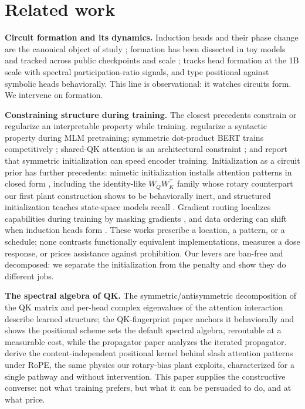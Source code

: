 \documentclass[11pt]{article}
\newcommand{\Rope}{RoPE\xspace}
\begin{document}
\section{Related work}
\textbf{Circuit formation and its dynamics.} Induction heads and their phase change are the canonical object of
study \citep{olsson2022induction}; formation has been dissected in toy models \citep{bietti2023birth,
reddy2024mechanistic,singh2024needs} and tracked across public checkpoints and scale
\citep{tigges2024llm}; \citet{xu2026when} tracks head formation at the 1B scale with spectral
participation-ratio signals, and \citet{urrutia2026positional} type positional against symbolic heads
behaviorally. This line is observational: it watches circuits form. We intervene on formation.

\textbf{Constraining structure during training.} The closest precedents constrain or regularize an interpretable
property while training. \citet{chen2024sudden} regularize a syntactic property during MLM pretraining;
symmetric dot-product BERT trains competitively \citep{courtois2024symmetric}; shared-QK attention is an
architectural constraint \citep{kitaev2020reformer}; and \citet{saponati2025} report that symmetric
initialization can speed encoder training. Initialization as a circuit prior has further precedents: mimetic
initialization installs attention patterns in closed form \citep{trockman2023mimetic}, including the
identity-like $W_QW_K^\top$ family whose rotary counterpart our first plant construction shows to be behaviorally
inert, and structured initialization teaches state-space models recall \citep{trockman2024mimeticssm}. Gradient
routing localizes capabilities during training by masking gradients \citep{cloud2024gradient}, and data ordering
can shift when induction heads form \citep{aoyama2026predicting}. These works prescribe a location, a pattern, or
a schedule; none contrasts functionally equivalent implementations, measures a dose response, or prices
assistance against prohibition. Our levers are ban-free and decomposed: we separate the initialization from the
penalty and show they do different jobs.

\textbf{The spectral algebra of QK.} The symmetric/antisymmetric decomposition of the QK matrix
\citep{saponati2025} and per-head complex eigenvalues of the attention interaction \citep{jamil2026routing}
describe learned structure; the QK-fingerprint paper \citep{li2026fingerprint} anchors it behaviorally and shows
the positional scheme sets the default spectral algebra, reroutable at a measurable cost, while the
propagator paper \citep{li2026pseudospectra} analyzes the iterated propagator. \citet{cheng2026slash} derive the
content-independent positional kernel behind slash attention patterns under \Rope, the same physics our
rotary-bias plant exploits, characterized for a single pathway and without intervention. This paper supplies the
constructive converse: not what training prefers, but what it can be persuaded to do, and at what price.
\end{document}
